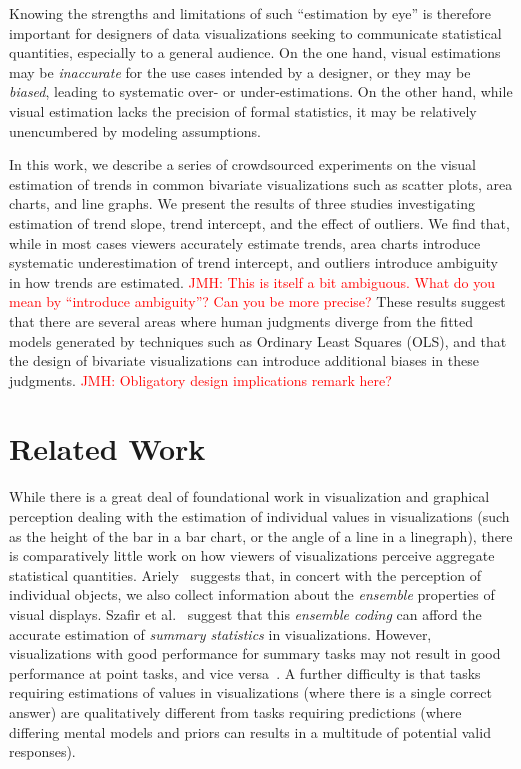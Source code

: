 \documentclass{sigchi}
\newcommand{\jeff}[1]{\textcolor{red}{JMH: #1}}
\begin{document}
Knowing the strengths and limitations of such ``estimation by eye'' is therefore important for designers of data visualizations seeking to communicate statistical quantities, especially to a general audience. On the one hand, visual estimations may be \emph{inaccurate} for the use cases intended by a designer, or they may be \emph{biased}, leading to systematic over- or under-estimations. On the other hand, while visual estimation lacks the precision of formal statistics, it may be relatively unencumbered by modeling assumptions.

In this work, we describe a series of crowdsourced experiments on the visual estimation of trends in common bivariate visualizations such as scatter plots, area charts, and line graphs. We present the results of three studies investigating estimation of trend slope, trend intercept, and the effect of outliers. We find that, while in most cases viewers accurately estimate trends, area charts introduce systematic underestimation of trend intercept, and outliers introduce ambiguity in how trends are estimated. \jeff{This is itself a bit ambiguous. What do you mean by ``introduce ambiguity''? Can you be more precise?} These results suggest that there are several areas where human judgments diverge from the fitted models generated by techniques such as Ordinary Least Squares (OLS), and that the design of bivariate visualizations can introduce additional biases in these judgments. \jeff{Obligatory design implications remark here?}

\section{Related Work}

While there is a great deal of foundational work in visualization and graphical perception dealing with the estimation of individual values in visualizations (such as the height of the bar in a bar chart, or the angle of a line in a linegraph), there is comparatively little work on how viewers of visualizations perceive aggregate statistical quantities. Ariely~\cite{ariely2001seeing} suggests that, in concert with the perception of individual objects, we also collect information about the \emph{ensemble} properties of visual displays. Szafir et al.~\cite{szafir2016four} suggest that this \emph{ensemble coding} can afford the accurate estimation of \emph{summary statistics} in visualizations. However, visualizations with good performance for summary tasks may not result in good performance at point tasks, and vice versa~\cite{albers2014task,fuchs2013evaluation}. A further difficulty is that tasks requiring estimations of values in visualizations (where there is a single correct answer) are qualitatively different from tasks requiring predictions (where differing mental models and priors can results in a multitude of potential valid responses).
\end{document}
